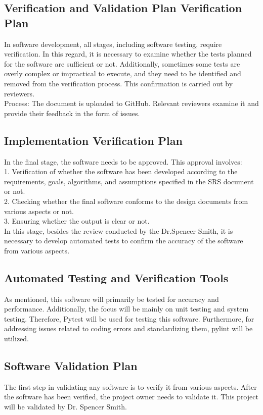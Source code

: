 \documentclass[12pt, titlepage]{article}
\begin{document}
\subsection{Verification and Validation Plan Verification Plan}
In software development, all stages, including software testing, require verification. In this regard, it is necessary to examine whether the tests planned for the software are sufficient or not. Additionally, sometimes some tests are overly complex or impractical to execute, and they need to be identified and removed from the verification process. This confirmation is carried out by reviewers.\\

Process: The document is uploaded to GitHub. Relevant reviewers examine it and provide their feedback in the form of issues.
\subsection{Implementation Verification Plan}



In the final stage, the software needs to be approved. This approval involves:\\
1. Verification of whether the software has been developed according to the requirements, goals, algorithms, and assumptions specified in the SRS document or not.\\
2. Checking whether the final software conforms to the design documents from various aspects or not.\\
3. Ensuring whether the output is clear or not.\\
In this stage, besides the review conducted by the Dr.Spencer Smith, it is necessary to develop automated tests to confirm the accuracy of the software from various aspects.
\subsection{Automated Testing and Verification Tools}

As mentioned, this software will primarily be tested for accuracy and performance. Additionally, the focus will be mainly on unit testing and system testing. Therefore, Pytest will be used for testing this software. Furthermore, for addressing issues related to coding errors and standardizing them, pylint will be utilized.

\subsection{Software Validation Plan}
The first step in validating any software is to verify it from various aspects. After the software has been verified, the project owner needs to validate it. This project will be validated by Dr. Spencer Smith.
\end{document}
